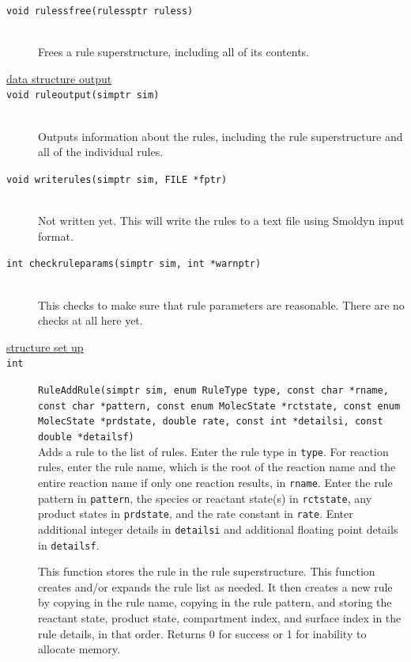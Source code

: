 \documentclass {scrbook}
\newcommand {\ttt} {\texttt}
\begin{document}
\begin{description}
\item[\ttt{void rulessfree(rulessptr ruless)}]
\hfill \\
Frees a rule superstructure, including all of its contents.

\item[\underline{data structure output}]

\item[\ttt{void ruleoutput(simptr sim)}]
\hfill \\
Outputs information about the rules, including the rule superstructure and all of the individual rules.

\item[\ttt{void writerules(simptr sim, FILE *fptr)}]
\hfill \\
Not written yet. This will write the rules to a text file using Smoldyn input format.

\item[\ttt{int checkruleparams(simptr sim, int *warnptr)}]
\hfill \\
This checks to make sure that rule parameters are reasonable. There are no checks at all here yet.

\item[\underline{structure set up}]

\item[\ttt{int}]
\ttt{RuleAddRule(simptr sim, enum RuleType type, const char *rname, const char *pattern, const enum MolecState *rctstate, const enum MolecState *prdstate, double rate, const int *detailsi, const double *detailsf)}
\hfill \\
Adds a rule to the list of rules. Enter the rule type in \ttt{type}. For reaction rules, enter the rule name, which is the root of the reaction name and the entire reaction name if only one reaction results, in \ttt{rname}. Enter the rule pattern in \ttt{pattern}, the species or reactant state(s) in \ttt{rctstate}, any product states in \ttt{prdstate}, and the rate constant in \ttt{rate}. Enter additional integer details in \ttt{detailsi} and additional floating point details in \ttt{detailsf}.

This function stores the rule in the rule superstructure. This function creates and/or expands the rule list as needed. It then creates a new rule by copying in the rule name, copying in the rule pattern, and storing the reactant state, product state, compartment index, and surface index in the rule details, in that order. Returns 0 for success or 1 for inability to allocate memory.


\end{description}
\end{document}
